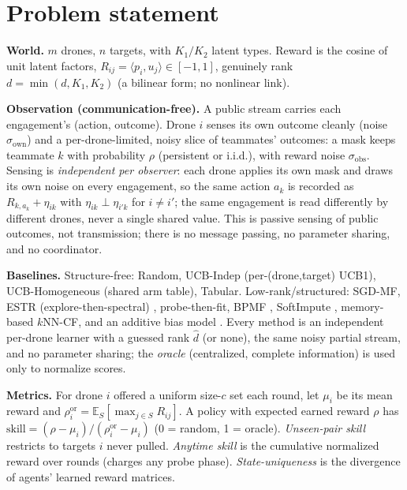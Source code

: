 \documentclass[11pt]{article}
\theoremstyle{plain}
\begin{document}
\section{Problem statement}
\textbf{World.} $m$ drones, $n$ targets, with $K_1/K_2$ latent types. Reward is the
cosine of unit latent factors, $R_{ij} = \langle p_i, u_j\rangle \in [-1,1]$,
genuinely rank $d = \min(d,K_1,K_2)$ (a bilinear form; no nonlinear link).

\textbf{Observation (communication-free).} A public stream carries each engagement's
(action, outcome). Drone $i$ senses its own outcome cleanly (noise $\sigma_{\text{own}}$)
and a per-drone-limited, noisy slice of teammates' outcomes: a mask keeps teammate
$k$ with probability $\rho$ (persistent or i.i.d.), with reward noise $\sigma_{\text{obs}}$.
Sensing is \emph{independent per observer}: each drone applies its own mask and draws its own
noise on every engagement, so the same action $a_k$ is recorded as $R_{k,a_k}+\eta_{ik}$ with
$\eta_{ik}\perp\eta_{i'k}$ for $i\neq i'$; the same engagement is read differently by different
drones, never a single shared value. This is passive sensing of public outcomes, not transmission; there is no message
passing, no parameter sharing, and no coordinator.

\textbf{Baselines.} Structure-free: Random, UCB-Indep (per-(drone,target) UCB1),
UCB-Homogeneous (shared arm table), Tabular. Low-rank/structured: SGD-MF, ESTR
(explore-then-spectral) \cite{jun2019bilinear}, probe-then-fit, BPMF
\cite{salakhutdinov2008bayesian}, SoftImpute \cite{mazumder2010spectral}, memory-based
$k$NN-CF, and an additive bias model \cite{koren2009matrix}. Every method is an
independent per-drone learner with a guessed rank $\hat d$ (or none), the same noisy
partial stream, and no parameter sharing; the \emph{oracle} (centralized, complete
information) is used only to normalize scores.

\textbf{Metrics.} For drone $i$ offered a uniform size-$c$ set each round, let
$\mu_i$ be its mean reward and $\rho^{\text{or}}_i = \mathbb{E}_S[\max_{j\in S} R_{ij}]$.
A policy with expected earned reward $\rho$ has
$\mathrm{skill} = (\rho-\mu_i)/(\rho^{\text{or}}_i-\mu_i)$ (0 = random, 1 = oracle).
\emph{Unseen-pair skill} restricts to targets $i$ never pulled. \emph{Anytime skill}
is the cumulative normalized reward over rounds (charges any probe phase).
\emph{State-uniqueness} is the divergence of agents' learned reward matrices.
\end{document}
